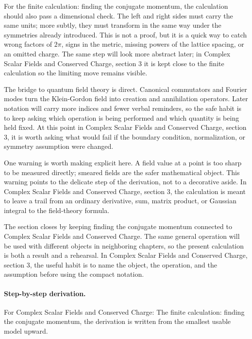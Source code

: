 For the finite calculation: finding the conjugate momentum, the calculation should also pass a dimensional check.  The left and right sides must carry the same units; more subtly, they must transform in the same way under the symmetries already introduced.  This is not a proof, but it is a quick way to catch wrong factors of \(2\pi\), signs in the metric, missing powers of the lattice spacing, or an omitted charge.  The same step will look more abstract later; in Complex Scalar Fields and Conserved Charge, section 3 it is kept close to the finite calculation so the limiting move remains visible.

The bridge to quantum field theory is direct.  Canonical commutators and Fourier modes turn the Klein-Gordon field into creation and annihilation operators.  Later notation will carry more indices and fewer verbal reminders, so the safe habit is to keep asking which operation is being performed and which quantity is being held fixed.  At this point in Complex Scalar Fields and Conserved Charge, section 3, it is worth asking what would fail if the boundary condition, normalization, or symmetry assumption were changed.

One warning is worth making explicit here.  A field value at a point is too sharp to be measured directly; smeared fields are the safer mathematical object.  This warning points to the delicate step of the derivation, not to a decorative aside.  In Complex Scalar Fields and Conserved Charge, section 3, the calculation is meant to leave a trail from an ordinary derivative, sum, matrix product, or Gaussian integral to the field-theory formula.

The section closes by keeping finding the conjugate momentum connected to Complex Scalar Fields and Conserved Charge.  The same general operation will be used with different objects in neighboring chapters, so the present calculation is both a result and a rehearsal.  In Complex Scalar Fields and Conserved Charge, section 3, the useful habit is to name the object, the operation, and the assumption before using the compact notation.



\paragraph{Step-by-step derivation.}

For Complex Scalar Fields and Conserved Charge: The finite calculation: finding the conjugate momentum, the derivation is written from the smallest usable model upward.

